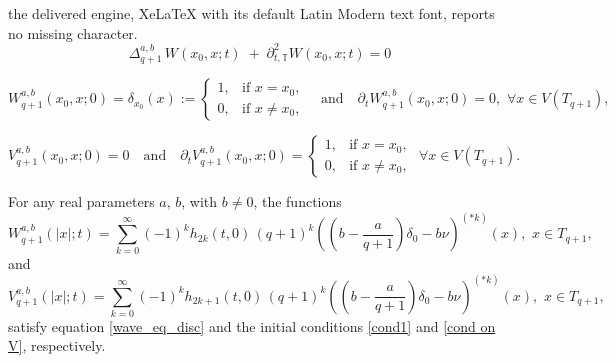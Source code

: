 \documentclass[10pt,a4paper]{amsart}
\begin{document}
the delivered engine, XeLaTeX with its default Latin Modern text font, reports no missing character.
\begin{equation}\label{wave_eq_disc}
\Delta_{q+1}^{a,b}\, W(x_0, x; t)
\;+\;
\partial_{t,\mathbb{T}}^2 W(x_0, x; t)
= 0
\end{equation}

\begin{equation}\label{cond1}
W_{q+1}^{a,b}(x_0, x; 0) =\delta_{x_0}(x):=
\begin{cases}
1, & \text{if } x = x_0, \\
0, & \text{if } x \neq x_0,
\end{cases} \quad \text{and}\quad \partial_t W_{q+1}^{a,b}(x_0, x; 0) = 0,\,\, \forall x\in V(T_{q+1}),
\end{equation}

\begin{equation}\label{cond on V}
V_{q+1}^{a,b}(x_0, x; 0) = 0 \quad \text{and}\quad  \partial_t  V_{q+1}^{a,b}(x_0, x; 0) =
\begin{cases}
1, & \text{if } x = x_0, \\
0, & \text{if } x \neq x_0,
\end{cases} \,\, \forall x\in V(T_{q+1}).
\end{equation}

\begin{lemma} \label{lem: kernels on tree}
For any real parameters $a,\, b$, with $b\neq 0$, the functions
\begin{equation}\label{wave w as conv}
W_{q+1}^{a,b}(|x|;t) = \sum_{k=0}^{\infty} (-1)^k h_{2k}(t,0)\,(q+1)^k \left(\left(b-\frac{a}{q+1}\right) \delta_0 -b\nu \right)^{(*k)}(x),\,\, x\in T_{q+1},
\end{equation}
and
\begin{equation} \label{wave V as conv}
V_{q+1}^{a,b}(|x|;t) = \sum_{k=0}^{\infty} (-1)^k h_{2k+1}(t,0)\,(q+1)^k \left(\left(b-\frac{a}{q+1}\right) \delta_0 -b\nu \right)^{(*k)}(x),\,\, x\in T_{q+1},
\end{equation}
satisfy equation \eqref{wave_eq_disc} and the initial conditions \eqref{cond1} and \eqref{cond on V}, respectively.
\end{lemma}
\end{document}
